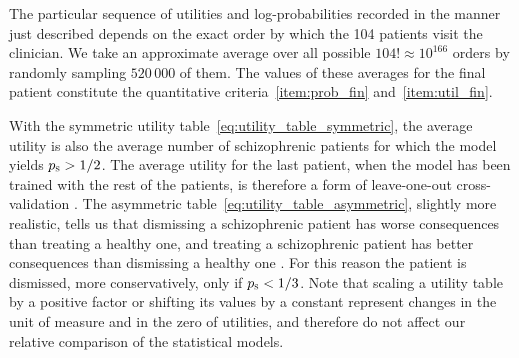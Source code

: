 \documentclass[%
]{frontiersSCNS-nologo} %
\renewcommand*{\|}{\mathpunct{|}}%
\newcommand*{\yhd}{\textsc{s}}
\newcommand*{\ypts}{p_{\yhd}}
\begin{document}
The particular sequence of utilities and log-probabilities recorded in the
manner just described depends on the exact order by which the 104 patients
visit the clinician. We take an approximate average over all possible
$104! \approx 10^{166}$ orders by randomly sampling $520\,000$ of them. The
values of these averages for the final patient constitute the quantitative
criteria~\ref{item:prob_fin} and~\ref{item:util_fin}.

With the symmetric utility table~\eqref{eq:utility_table_symmetric}, the
average utility is also the average number of schizophrenic patients for
which the model yields $\ypts > 1/2$. The average utility for the last
patient, when the model has been trained with the rest of the patients, is
therefore a form of leave-one-out cross-validation \citep[vol.~2,
pp.~1454--1458]{allen1974,stone1974,kotzetal1982_r2006}. The asymmetric
table~\eqref{eq:utility_table_asymmetric}, slightly more realistic, tells
us that dismissing a schizophrenic patient has worse consequences than
treating a healthy one, and treating a schizophrenic patient has better
consequences than dismissing a healthy one \citep{mckenzie2014,hoetal2000}.
For this reason the patient is dismissed, more conservatively, only if
$\ypts<1/3$. Note that scaling a utility table by a positive factor or
shifting its values by a constant represent changes in the unit of measure
and in the zero of utilities, and therefore do not affect our relative
comparison of the statistical models.
\end{document}
